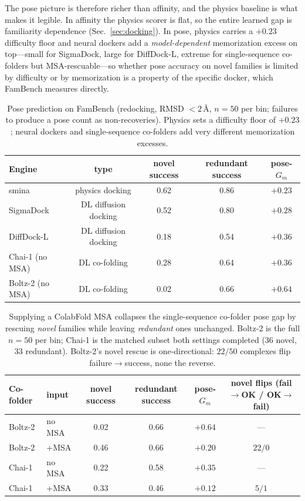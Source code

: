 \documentclass[11pt]{article}
\begin{document}
The pose picture is therefore richer than affinity, and the physics baseline is what makes it legible.
In affinity the physics scorer is flat, so the entire learned gap is familiarity dependence
(Sec.~\ref{sec:docking}). In pose, physics carries a $+0.23$ difficulty floor and neural dockers add a
\emph{model-dependent} memorization excess on top---small for SigmaDock, large for DiffDock-L, extreme
for single-sequence co-folders but MSA-rescuable---so whether pose accuracy on novel families is
limited by difficulty or by memorization is a property of the specific docker, which FamBench measures
directly.

\begin{table}[t]
\centering\small
\caption{Pose prediction on FamBench (redocking, RMSD $<2$\,\AA, $n{=}50$ per bin; failures to
produce a pose count as non-recoveries). Physics sets a difficulty floor of $+0.23$; neural dockers
and single-sequence co-folders add very different memorization excesses.}
\label{tab:pose}
\begin{tabular}{lcccc}
\toprule
Engine & type & novel success & redundant success & pose-$G_m$ \\
\midrule
smina      & physics docking     & 0.62 & 0.86 & $+0.23$ \\
SigmaDock  & DL diffusion docking & 0.52 & 0.80 & $+0.28$ \\
DiffDock-L & DL diffusion docking & 0.18 & 0.54 & $+0.36$ \\
Chai-1 (no MSA)  & DL co-folding & 0.28 & 0.64 & $+0.36$ \\
Boltz-2 (no MSA) & DL co-folding & 0.02 & 0.66 & $+0.64$ \\
\bottomrule
\end{tabular}
\end{table}

\begin{table}[t]
\centering\small
\caption{Supplying a ColabFold MSA collapses the single-sequence co-folder pose gap by rescuing
\emph{novel} families while leaving \emph{redundant} ones unchanged. Boltz-2 is the full $n{=}50$ per
bin; Chai-1 is the matched subset both settings completed ($36$ novel, $33$ redundant). Boltz-2's
novel rescue is one-directional: $22/50$ complexes flip failure$\to$success, none the reverse.}
\label{tab:posemsa}
\begin{tabular}{llcccc}
\toprule
Co-folder & input & novel success & redundant success & pose-$G_m$ & novel flips (fail$\to$OK / OK$\to$fail) \\
\midrule
Boltz-2 & no MSA & 0.02 & 0.66 & $+0.64$ & --- \\
Boltz-2 & +MSA   & 0.46 & 0.66 & $+0.20$ & $22 / 0$ \\
Chai-1  & no MSA & 0.22 & 0.58 & $+0.35$ & --- \\
Chai-1  & +MSA   & 0.33 & 0.46 & $+0.12$ & $5 / 1$ \\
\bottomrule
\end{tabular}
\end{table}
\end{document}
